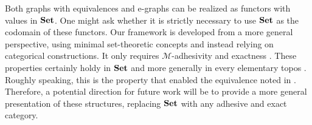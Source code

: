 Both graphs with equivalences and e-graphs can be realized as functors with values in $\mathbf{Set}$. One might ask whether it is strictly necessary to use $\mathbf{Set}$ as the codomain of these functors. Our framework is developed from a more general perspective, using minimal set-theoretic concepts and instead relying on categorical constructions. It only requires $\mathcal{M}$-adhesivity and exactness  \cite{barrexact}. These properties certainly holdy in $\mathbf{Set}$ and more generally in every elementary topos \cite{maclane2012sheaves}. Roughly speaking, this is  the property that enabled the equivalence noted in . Therefore, a potential direction for future work will be to provide a more general presentation of these structures, replacing $\mathbf{Set}$ with any adhesive and exact category.